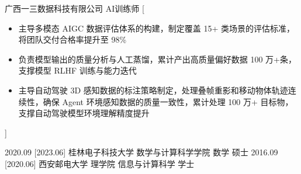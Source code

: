 \documentclass[zh]{resume}
\begin{document}
\begin{experiences}
    {广西一三数据科技有限公司 \quad AI训练师}%
    [\begin{itemize}
      \item 主导多模态 AIGC 数据评估体系的构建，制定覆盖 15+ 类场景的评估标准，将团队交付合格率提升至 98\%
      \item 负责模型输出的质量分析与人工蒸馏，累计产出高质量偏好数据 100 万+条，支撑模型 RLHF 训练与能力迭代
      \item 主导自动驾驶 3D 感知数据的标注策略制定，处理叠帧重影和移动物体轨迹连续性，确保 Agent 环境感知数据的质量一致性，累计处理 100 万+ 目标物，支撑自动驾驶模型环境理解精度提升
    \end{itemize}]
\end{experiences}

\begin{educations}
  \education%
    {2020.09}%
    [2023.06]%
    {桂林电子科技大学}%
    {数学与计算科学学院}%
    {数学}%
    {硕士}
  \separator{0.2ex}
  \education%
    {2016.09}%
    [2020.06]%
    {西安邮电大学}%
    {理学院}%
    {信息与计算科学}%
    {学士}
\end{educations}
\end{document}
